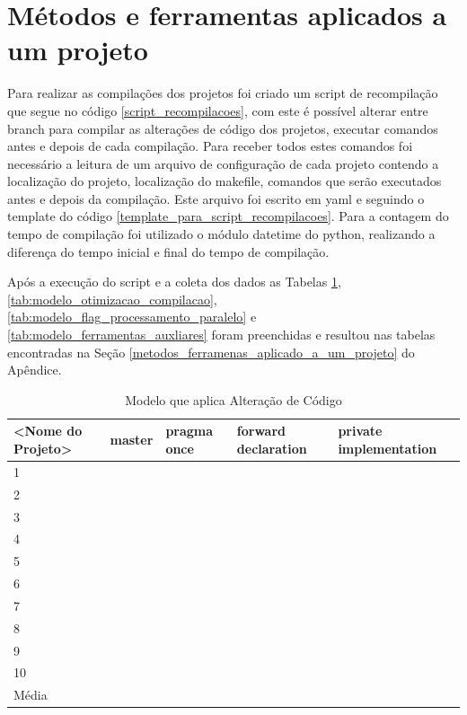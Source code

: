 \section{Métodos e ferramentas aplicados a um projeto}

Para realizar as compilações dos projetos foi criado um script de recompilação que
 segue no código \ref{script_recompilacoes}, com este é possível alterar entre
 branch para compilar as alterações de código dos projetos,
 executar comandos antes e depois de cada compilação.
 Para receber todos estes comandos foi necessário a leitura de um arquivo de
 configuração de cada projeto contendo a localização do projeto,
 localização do makefile, comandos que serão executados antes e depois
 da compilação.
 Este arquivo foi escrito em yaml e seguindo o template do código
 \ref{template_para_script_recompilacoes}.
Para a contagem do tempo de compilação foi utilizado o módulo datetime do python,
 realizando a diferença do tempo inicial e final do tempo de compilação.

	Após a execução do script e a coleta dos dados as Tabelas \ref{tab:modelo_alteracao_de_codigo},
 \ref{tab:modelo_otimizacao_compilacao}, \ref{tab:modelo_flag_processamento_paralelo} e
\ref{tab:modelo_ferramentas_auxliares} foram preenchidas e resultou nas tabelas encontradas na Seção 
\ref{metodos_ferramenas_aplicado_a_um_projeto} do Apêndice.

\begin{table}[!ht]
\centering
\tiny
\caption{Modelo que aplica Alteração de Código}
\label{tab:modelo_alteracao_de_codigo}
\begin{tabular}{lllll}
\textbf{<Nome do Projeto>} & \textbf{master} & \textbf{pragma once} & \textbf{forward declaration} & \textbf{private implementation}   \\ \toprule
1                             &      &     &     &        \\ 
2                             &      &     &     &        \\ 
3                             &      &     &     &        \\ 
4                             &      &     &     &        \\ 
5                             &      &     &     &        \\ 
6                             &      &     &     &        \\ 
7                             &      &     &     &        \\ 
8                             &      &     &     &        \\ 
9                             &      &     &     &        \\ 
10                            &      &     &     &        \\ \bottomrule
Média                         &      &     &     &        \\ 
\end{tabular}
\end{table}


